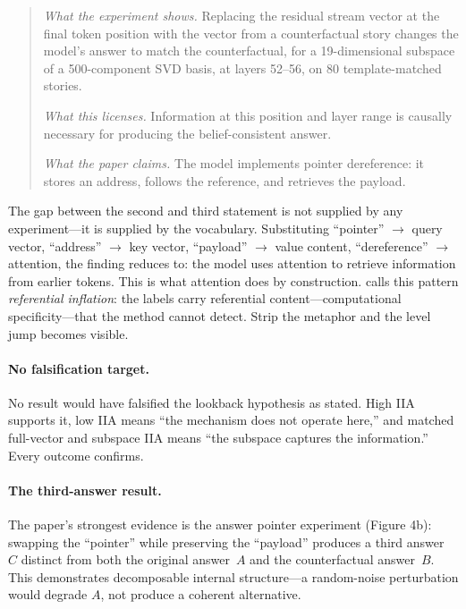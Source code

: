 \documentclass[11pt]{article}
\begin{document}
\begin{quote}
\emph{What the experiment shows.} Replacing the residual stream vector at the final token position with the vector from a counterfactual story changes the model's answer to match the counterfactual, for a 19-dimensional subspace of a 500-component SVD basis, at layers 52--56, on 80 template-matched stories.

\emph{What this licenses.} Information at this position and layer range is causally necessary for producing the belief-consistent answer.

\emph{What the paper claims.} The model implements pointer dereference: it stores an address, follows the reference, and retrieves the payload.
\end{quote}

The gap between the second and third statement is not supplied by any experiment---it is supplied by the vocabulary. Substituting ``pointer'' $\rightarrow$ query vector, ``address'' $\rightarrow$ key vector, ``payload'' $\rightarrow$ value content, ``dereference'' $\rightarrow$ attention, the finding reduces to: the model uses attention to retrieve information from earlier tokens. This is what attention does by construction. \citet{tower2026mechref} calls this pattern \emph{referential inflation}: the labels carry referential content---computational specificity---that the method cannot detect. Strip the metaphor and the level jump becomes visible.

\paragraph{No falsification target.}
No result would have falsified the lookback hypothesis as stated. High IIA supports it, low IIA means ``the mechanism does not operate here,'' and matched full-vector and subspace IIA means ``the subspace captures the information.'' Every outcome confirms.

\paragraph{The third-answer result.}
The paper's strongest evidence is the answer pointer experiment (Figure 4b): swapping the ``pointer'' while preserving the ``payload'' produces a third answer~$C$ distinct from both the original answer~$A$ and the counterfactual answer~$B$. This demonstrates decomposable internal structure---a random-noise perturbation would degrade $A$, not produce a coherent alternative.
\end{document}
